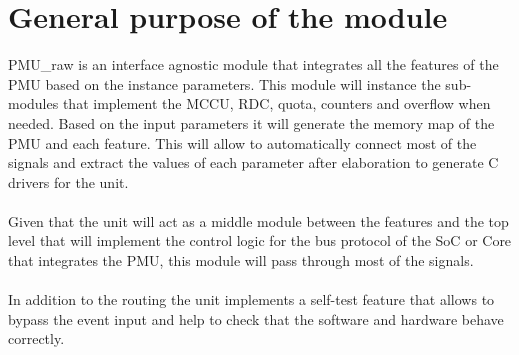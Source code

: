 \newpage
\section{General purpose of the module}
PMU\_raw is an interface agnostic module that integrates all the features of the PMU based on the instance parameters. This module will instance the sub-modules that implement the MCCU, RDC, quota, counters and overflow when needed. Based on the input parameters it will generate the memory map of the PMU and each feature. This will allow to automatically connect most of the signals and extract the values of  each parameter after elaboration to generate C drivers for the unit.\\
\\
Given that the unit will act as a middle module between the features and the top level that will implement the control logic for the bus protocol of the SoC or Core that integrates the PMU, this module will pass through most of the signals.\\
\\
In addition to the routing the unit implements a self-test feature that allows to bypass the  event input and help to check that the software and hardware behave correctly.